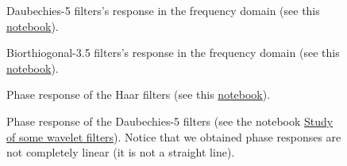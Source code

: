 \begin{figure}
  \centering
  \caption{Daubechies-5 filters's response in the frequency domain
    (see this
    \href{https://github.com/Sistemas-Multimedia/Sistemas-Multimedia.github.io/blob/master/milestones/08-DWT/DWT_filters_analysis.ipynb}{notebook}).}
  \label{fig:db5_modulus}
\end{figure}

\begin{figure}
  \centering
  \caption{Biorthiogonal-3.5 filters's response in the frequency
    domain (see this
    \href{https://github.com/Sistemas-Multimedia/Sistemas-Multimedia.github.io/blob/master/milestones/08-DWT/DWT_filters_analysis.ipynb}{notebook}).}
  \label{fig:bior3.5_modulus}
\end{figure}

\begin{figure}
  \centering
  \caption{Phase response of the Haar filters (see this
    \href{https://github.com/Sistemas-Multimedia/Sistemas-Multimedia.github.io/blob/master/milestones/08-DWT/DWTfilters_analysis.ipynb}{notebook}).}
  \label{fig:haar_phase}
\end{figure}

\begin{figure}
  \centering
  \caption{Phase response of the Daubechies-5 filters (see the
    notebook
    \href{https://github.com/vicente-gonzalez-ruiz/DWT/blob/master/docs/graphics/DWT_filters_study.ipynb}{Study
      of some wavelet filters}). Notice that we obtained phase
    responses are not completely linear (it is not a straight line).}
  \label{fig:db5_phase}
\end{figure}

